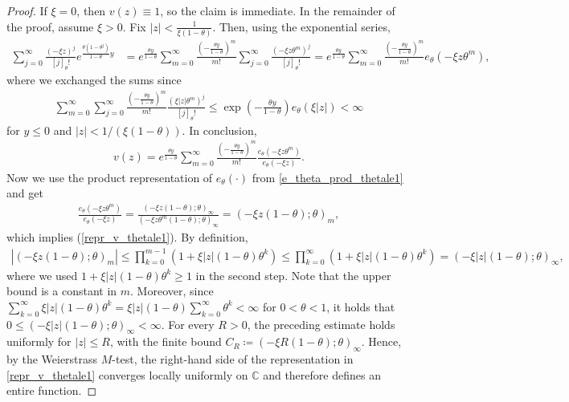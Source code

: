\documentclass[12pt]{article}
\newcommand{\C}{\mathbb{C}} %
\newcommand{\1}{\mathds{1}}
\theoremstyle{definition}
\theoremstyle{plain}
\theoremstyle{remark}
\begin{document}
\begin{proof}
If $\xi=0$, then $v(z)\equiv1$, so the claim is immediate.
In the remainder of the proof, assume $\xi>0$. Fix $|z|<\frac{1}{\xi(1-\theta)}$.  
Then, using the exponential series,
\begin{align*}
    \sum_{j=0}^\infty \frac{(-\xi z)^{j}}{[j]_\theta!}e^{\frac{\theta(1-\theta^j)}{1-\theta}y}
    &=e^{\frac{\theta y}{1-\theta}}\sum_{m=0}^\infty\frac{\left(-\frac{\theta y}{1-\theta}\right)^m}{m!}\sum_{j=0}^\infty \frac{(-\xi z\theta^m)^{j}}{[j]_\theta!}
    =e^{\frac{\theta y}{1-\theta}}\sum_{m=0}^\infty\frac{\left(-\frac{\theta y}{1-\theta}\right)^m}{m!}e_\theta(-\xi z\theta^m),
\end{align*}
where we exchanged the sums since 
\begin{align*}
    \sum_{m=0}^\infty\sum_{j=0}^\infty
    \frac{\left(-\frac{\theta y}{1-\theta}\right)^m}{m!}
    \frac{(\xi|z|\theta^m)^j}{[j]_\theta!}
    \leq\exp\left(-\frac{\theta y}{1-\theta}\right)e_\theta(\xi|z|)
    <\infty
\end{align*}
for $y\le 0$ and $|z|<1/(\xi(1-\theta))$.
In conclusion, 
\begin{align*}
    v(z)=e^{\frac{\theta y}{1-\theta}}\sum_{m=0}^\infty\frac{\left(-\frac{\theta y}{1-\theta}\right)^m}{m!}\frac{e_\theta(-\xi z\theta^m)}{e_\theta(-\xi z)}.
\end{align*}
Now we use the product representation of $e_\theta(\cdot)$ from \eqref{e_theta_prod_thetale1} and get
\begin{align*}
    \frac{e_\theta(-\xi z\theta^m)}{e_\theta(-\xi z)}
    =\frac{(-\xi z(1-\theta);\theta)_\infty}{(-\xi z\theta^m(1-\theta);\theta)_\infty}
    =(-\xi z(1-\theta);\theta)_m,
\end{align*}
which implies (\ref{repr_v_thetale1}).
By definition,
\begin{align*}
    |(-\xi z(1-\theta);\theta)_m|
    \le\prod_{k=0}^{m-1}(1+\xi|z|(1-\theta)\theta^k)
    \le\prod_{k=0}^{\infty}(1+\xi|z|(1-\theta)\theta^k)
   \! =\!(-\xi |z|(1-\theta);\theta)_\infty,
\end{align*}
where we used $1+\xi|z|(1-\theta)\theta^k\ge 1$ in the second step. Note that the upper bound is a constant in $m$. Moreover, since $\sum_{k=0}^\infty\xi|z|(1-\theta)\theta^k=\xi|z|(1-\theta)\sum_{k=0}^\infty\theta^k<\infty$ for $0<\theta<1$, it holds that $0\le (-\xi |z|(1-\theta);\theta)_\infty<\infty$. For every $R>0$, the preceding estimate holds uniformly for $|z|\leq R$, with the finite bound
$C_R\coloneqq(-\xi R(1-\theta);\theta)_\infty$. Hence, by the Weierstrass $M$-test, the right-hand side of the representation in \eqref{repr_v_thetale1} converges locally uniformly on $\C$ and therefore defines an entire function.
\end{proof}
\end{document}
